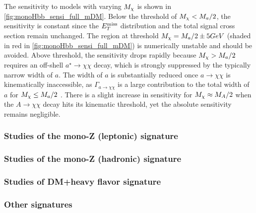 The sensitivity to models with varying $M_{\chi}$ is shown in  \autoref{fig:monoHbb_sensi_full_mDM}.
Below the threshold of $M_{\chi} < M_{a}/2$, the sensitivity is constant since the $E_T^\mathrm{miss}$ distribution and the total signal cross section remain unchanged.%
The region at threshold $M_{\chi} = M_{a}/2 \pm 5 GeV$ (shaded in red in \autoref{fig:monoHbb_sensi_full_mDM}) is numerically unstable and should be avoided. 
Above threshold, the sensitivity drops rapidly because $M_{\chi} > M_{a}/2$ requires an off-shell $a^{\star} \to \chi\chi$ decay, which is strongly suppressed by the typically narrow width of $a$. 
The width of $a$ is substantially reduced once $a\to \chi \chi$ is kinematically inaccessible, as $\Gamma_{a\to \chi \chi}$ is a large contribution to the total width of $a$ for $M_{\chi} \leq M_{a}/2$ \cite{Bauer:2017ota}.
There is a slight increase in sensitivity for $M_{\chi} \approx M_{A}/2$ when the $A\to \chi\chi$ decay hits its kinematic threshold, yet the absolute sensitivity remains negligible.

\FloatBarrier
\subsubsection{Studies of the mono-Z (leptonic) signature}

\FloatBarrier
\subsubsection{Studies of the mono-Z (hadronic) signature}


\subsubsection{Studies of DM+heavy flavor signature}
%

\subsubsection{Other signatures}


